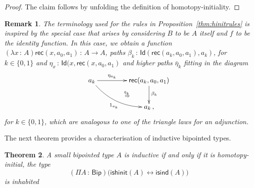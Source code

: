 \documentclass[10pt,a4paper,oneside,reqno]{amsart}
\numberwithin{equation}{section}
\theoremstyle{mythm}
\newtheorem{theorem}{Theorem}[section]
\theoremstyle{mydef}
\theoremstyle{myrmk}
\newtheorem{remark}[theorem]{Remark}
\newcommand{\ie}{\text{i.e.\ }}
\newcommand{\co}{\,{:}\,}
\newcommand{\isbipind}{\mathsf{isind}}
\newcommand{\isbiphinit}{\mathsf{ishinit}}
\newcommand{\Id}{\mathsf{Id}}
\newcommand{\Bip}{\mathsf{Bip}}
\newcommand{\rec}{\mathsf{rec}}
\begin{document}
\begin{proof} The claim follows by unfolding the definition of homotopy-initiality.
\end{proof} 

\begin{remark} \label{thm:etarule} The terminology used for the rules in Proposition~\ref{thm:hinitrules} is
inspired by the special case that arises by considering $B$ to be $A$ itself and $f$ to be the identity function.
In this case, we obtain a function $(\lambda x \co A) \rec(x, a_0, a_1) \co A \to A$, paths $\beta_k \co
\Id( \rec(a_k, a_0, a_1), a_k)$, for $k \in \{ 0, 1 \}$ and $\eta_x \co \Id(x, \rec(x, a_0, a_1)$ and higher paths
$\bar{\eta}_k$ fitting in the diagram
\[
\xymatrix@C=1.5cm{
a_k \ar[r]^-{\eta_{a_k}} \ar@/_1pc/[dr]_{1_{a_k}} \ar@{}[dr]|{\qquad \overset{\bar{\eta}_k\; }{\Rightarrow}} & \rec(a_k, a_0, a_1) \ar[d]^{\beta_k} \\ 
 & a_k\, ,}
 \]
 for $k \in \{ 0, 1\}$,  which are analogous to one of the triangle laws for an adjunction. 
\end{remark} 


The next theorem provides a characterisation of inductive bipointed types.






\begin{theorem}\label{thm:bipointedmain} A small bipointed type 
 $A$ is inductive if and only if it is homotopy-initial, \ie  the type
\[
(\Pi A \co \Bip) \big(  \isbiphinit(A) \leftrightarrow \isbipind(A) \big)
\] 
is inhabited
\end{theorem}
\end{document}

